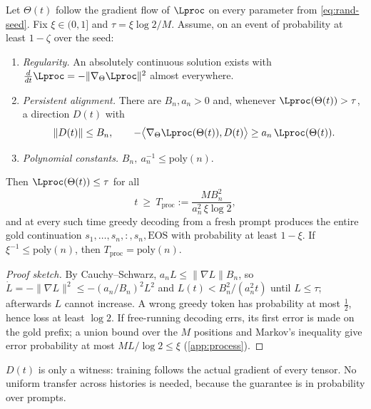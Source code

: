\begin{theorem}\label{thm:process}
Let $\Theta(t)$ follow the gradient flow of $\Lproc$ on every parameter from \cref{eq:rand-seed}. Fix $\xi\in(0,1]$ and $\tau=\xi\log2/M$. Assume, on an event of probability at least $1-\zeta$ over the seed:
\begin{enumerate}[label=(P\arabic*),ref=(P\arabic*),leftmargin=*,itemsep=1pt]
\item\label{hyp:regular} \emph{Regularity.} An absolutely continuous solution exists with $\frac{d}{dt}\Lproc=-\|\nabla_\Theta\Lproc\|^2$ almost everywhere.
\item\label{hyp:align} \emph{Persistent alignment.} There are $B_n,a_n>0$ and, whenever $\Lproc(\Theta(t))>\tau$, a direction $D(t)$ with
\begin{equation}\label{eq:align}
\|D(t)\|\le B_n,\qquad -\bigl\langle\nabla_\Theta\Lproc(\Theta(t)),D(t)\bigr\rangle\ge a_n\,\Lproc(\Theta(t)).
\end{equation}
\item\label{hyp:poly} \emph{Polynomial constants.} $B_n,\ a_n^{-1}\le\mathrm{poly}(n)$.
\end{enumerate}
Then $\Lproc(\Theta(t))\le\tau$ for all
\begin{equation}\label{eq:proc-time}
t\ \ge\ T_{\mathrm{proc}}:=\frac{M B_n^2}{a_n^2\,\xi\log2},
\end{equation}
and at every such time greedy decoding from a fresh prompt produces the entire gold continuation $s_1,\ldots,s_n,{:},s_n,\mathrm{EOS}$ with probability at least $1-\xi$. If $\xi^{-1}\le\mathrm{poly}(n)$, then $T_{\mathrm{proc}}=\mathrm{poly}(n)$.
\end{theorem}
\begin{proof}[Proof sketch]
By Cauchy--Schwarz, $a_nL\le\|\nabla L\|B_n$, so $\dot L=-\|\nabla L\|^2\le-(a_n/B_n)^2L^2$ and $L(t)<B_n^2/(a_n^2t)$ until $L\le\tau$; afterwards $L$ cannot increase. A wrong greedy token has probability at most $\frac12$, hence loss at least $\log2$. If free-running decoding errs, its first error is made on the gold prefix; a union bound over the $M$ positions and Markov's inequality give error probability at most $ML/\log2\le\xi$ (\cref{app:process}).
\end{proof}
$D(t)$ is only a witness: training follows the actual gradient of every tensor. No uniform transfer across histories is needed, because the guarantee is in probability over prompts.


